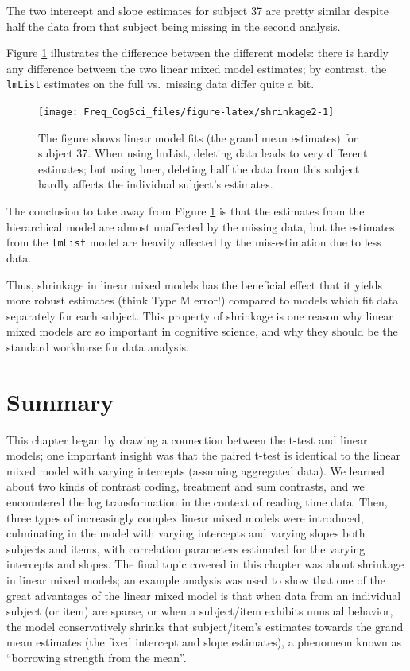 \documentclass[
  12pt,
]{krantz}
\theoremstyle{definition}
\theoremstyle{definition}
\theoremstyle{definition}
\theoremstyle{definition}
\theoremstyle{remark}
\begin{document}
The two intercept and slope estimates for subject 37 are pretty similar despite half the data from that subject being missing in the second analysis.

Figure \ref{fig:shrinkage2} illustrates the difference between the different models: there is hardly any difference between the two linear mixed model estimates; by contrast, the \texttt{lmList} estimates on the full vs.~missing data differ quite a bit.

\begin{figure}
\texttt{[image: Freq\_CogSci\_files/figure-latex/shrinkage2-1]} \caption{The figure shows linear model fits (the grand mean estimates) for subject 37. When using lmList, deleting data leads to very different estimates; but using lmer, deleting half the data from this subject hardly affects the individual subject's estimates.}\label{fig:shrinkage2}
\end{figure}

The conclusion to take away from Figure \ref{fig:shrinkage2} is that the estimates from the hierarchical model are almost unaffected by the missing data, but the estimates from the \texttt{lmList} model are heavily affected by the mis-estimation due to less data.

Thus, shrinkage in linear mixed models has the beneficial effect that it yields more robust estimates (think Type M error!) compared to models which fit data separately for each subject. This property of shrinkage is one reason why linear mixed models are so important in cognitive science, and why they should be the standard workhorse for data analysis.

\hypertarget{summary-2}{%
\section{Summary}\label{summary-2}}

This chapter began by drawing a connection between the t-test and linear models; one important insight was that the paired t-test is identical to the linear mixed model with varying intercepts (assuming aggregated data). We learned about two kinds of contrast coding, treatment and sum contrasts, and we encountered the log transformation in the context of reading time data. Then, three types of increasingly complex linear mixed models were introduced, culminating in the model with varying intercepts and varying slopes both subjects and items, with correlation parameters estimated for the varying intercepts and slopes. The final topic covered in this chapter was about shrinkage in linear mixed models; an example analysis was used to show that one of the great advantages of the linear mixed model is that when data from an individual subject (or item) are sparse, or when a subject/item exhibits unusual behavior, the model conservatively shrinks that subject/item's estimates towards the grand mean estimates (the fixed intercept and slope estimates), a phenomeon known as ``borrowing strength from the mean''.
\end{document}
